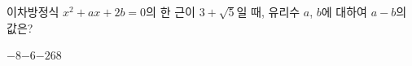 이차방정식 $x^2+ax+2b=0$의 한 근이 $3+\sqrt{5}$일 때, 유리수 $a$, $b$에 대하여 $a-b$의 값은?
\begin{choices32}{$-8$}{$-6$}{$-2$}{$6$}{$8$}\end{choices32}

